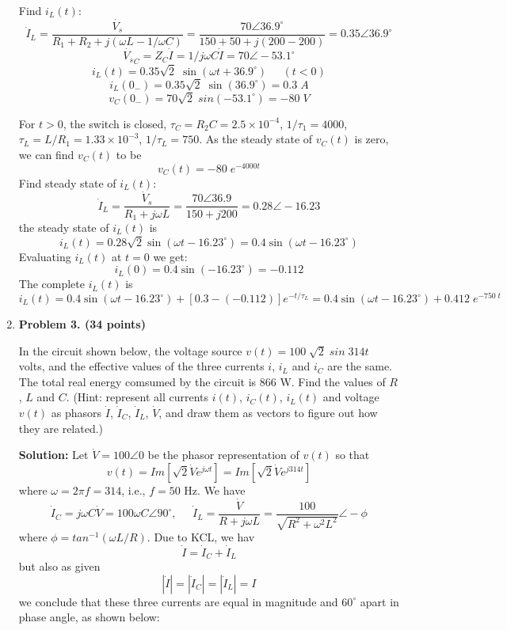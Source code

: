 \begin{enumerate}
Find $i_L(t)$:
\[ \dot{I}_L=\frac{\dot{V_s}}{R_1+R_2+j(\omega L-1/\omega C)}
=\frac{70\angle 36.9^\circ}{150+50+j(200-200)}=0.35\angle 36.9^\circ \]
\[ \dot{V_s}_C=Z_C \dot{I}=1/j\omega C \dot{I}=70\angle -53.1^\circ \]
\[ i_L(t)=0.35\sqrt{2}\;\sin(\omega t+36.9^\circ)\;\;\;\;\;(t<0) \]
\[ i_L(0_-)=0.35\sqrt{2}\;\sin(36.9^\circ)=0.3\;A \]
\[ v_C(0_-)=70\sqrt{2}\;sin(-53.1^\circ)=-80\;V \]

For $t>0$, the switch is closed, $\tau_C=R_2C=2.5\times 10^{-4}$, 
$1/\tau_1=4000$, $\tau_L=L/R_1=1.33\times 10^{-3}$, $1/\tau_L=750$.
As the steady state of $v_C(t)$ is zero, we can find $v_C(t)$ to be
\[ v_C(t)=-80\;e^{-4000  t} \]
Find steady state of $i_L(t)$:
\[ \dot{I}_L=\frac{\dot{V}_s}{R_1+j\omega L}=\frac{70\angle 36.9}{150+j200}
=0.28\angle -16.23 \]
the steady state of $i_L(t)$ is
\[ i_L(t)=0.28\sqrt{2}\sin(\omega t-16.23^\circ)=0.4\sin(\omega t-16.23^\circ) \]
Evaluating $i_L(t)$ at $t=0$ we get:
\[ i_L(0)=0.4\sin(-16.23^\circ)=-0.112 \]
The complete $i_L(t)$ is
\[ i_L(t)=0.4\sin(\omega t-16.23^\circ)+[0.3-(-0.112)]e^{-t/\tau_L}
=0.4\sin(\omega t-16.23^\circ)+0.412\;e^{-750\;t} \]

\item {\bf Problem 3. (34 points)} 

In the circuit shown below, the voltage source $v(t)=100\;\sqrt{2}\;sin\;314t\;$ volts,
and the effective values of the three currents $i$, $i_L$ and $i_C$ are the same. The
total real energy comsumed by the circuit is 866 W. Find the values of $R$, $L$ and $C$.
(Hint: represent all currents $i(t)$, $i_C(t)$, $i_L(t)$ and voltage $v(t)$ as phasors 
$\dot{I}$, $\dot{I}_C$, $\dot{I}_L$, $\dot{V}$, and draw them as vectors to figure out
how they are related.)



{\bf Solution:}
Let $\dot{V}=100\angle 0$ be the phasor representation of $v(t)$ so that 
\[ v(t)=Im[\sqrt{2} \dot{V} e^{j\omega t}] =Im[\sqrt{2} \dot{V} e^{j314t}] \]
where $\omega=2\pi f=314$, i.e., $f=50$ Hz. We have
\[ \dot{I}_C=j\omega C \dot{V}=100\omega C \angle 90^\circ,
\;\;\;\;\;\dot{I}_L=\frac{\dot{V}}{R+j\omega L}=\frac{100}{\sqrt{R^2+\omega^2 L^2}}\angle -\phi \]
where $\phi=tan^{-1}(\omega L/R)$. Due to KCL, we hav
\[ \dot{I}=\dot{I}_C+\dot{I}_L \]
but also as given
\[ |\dot{I}|=|\dot{I}_C|=|\dot{I}_L|=I \]
we conclude that these three currents are equal in magnitude and $60^\circ$ apart in 
phase angle, as shown below:


\end{enumerate}
